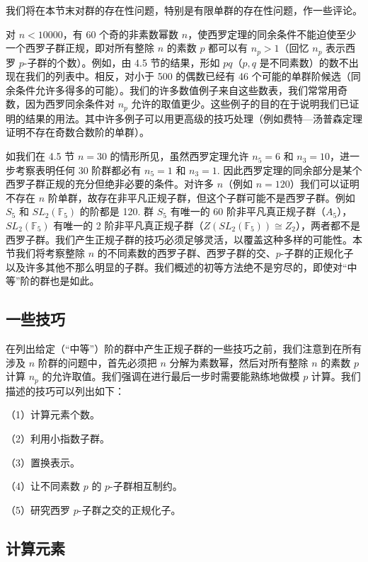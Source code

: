 我们将在本节末对群的存在性问题，特别是有限单群的存在性问题，作一些评论。

对 \(n < 10000\)，有 60 个奇的非素数幂数 \(n\)，使西罗定理的同余条件不能迫使至少一个西罗子群正规，即对所有整除 \(n\) 的素数 \(p\) 都可以有 \(n_p > 1\)（回忆 \(n_p\) 表示西罗 \(p\)-子群的个数）。例如，由 4.5 节的结果，形如 \(pq\)（\(p, q\) 是不同素数）的数不出现在我们的列表中。相反，对小于 500 的偶数已经有 46 个可能的单群阶候选（同余条件允许多得多的可能）。我们的许多数值例子来自这些数表，我们常常用奇数，因为西罗同余条件对 \(n_p\) 允许的取值更少。这些例子的目的在于说明我们已证明的结果的用法。其中许多例子可以用更高级的技巧处理（例如费特—汤普森定理证明不存在奇数合数阶的单群）。

如我们在 4.5 节 \(n = 30\) 的情形所见，虽然西罗定理允许 \(n_5 = 6\) 和 \(n_3 = 10\)，进一步考察表明任何 30 阶群都必有 \(n_5 = 1\) 和 \(n_3 = 1\). 因此西罗定理的同余部分是某个西罗子群正规的充分但绝非必要的条件。对许多 \(n\)（例如 \(n = 120\)）我们可以证明不存在 \(n\) 阶单群，故存在非平凡正规子群，但这个子群可能不是西罗子群。例如 \(S_5\) 和 \(SL_2(\mathbb{F}_5)\) 的阶都是 120. 群 \(S_5\) 有唯一的 60 阶非平凡真正规子群（\(A_5\)），\(SL_2(\mathbb{F}_5)\) 有唯一的 2 阶非平凡真正规子群（\(Z(SL_2(\mathbb{F}_5)) \cong Z_2\)），两者都不是西罗子群。我们产生正规子群的技巧必须足够灵活，以覆盖这种多样的可能性。本节我们将考察整除 \(n\) 的不同素数的西罗子群、西罗子群的交、\(p\)-子群的正规化子以及许多其他不那么明显的子群。我们概述的初等方法绝不是穷尽的，即使对“中等”阶的群也是如此。

\subsection*{一些技巧}

在列出给定（“中等”）阶的群中产生正规子群的一些技巧之前，我们注意到在所有涉及 \(n\) 阶群的问题中，首先必须把 \(n\) 分解为素数幂，然后对所有整除 \(n\) 的素数 \(p\) 计算 \(n_p\) 的允许取值。我们强调在进行最后一步时需要能熟练地做模 \(p\) 计算。我们描述的技巧可以列出如下：

（1）计算元素个数。

（2）利用小指数子群。

（3）置换表示。

（4）让不同素数 \(p\) 的 \(p\)-子群相互制约。

（5）研究西罗 \(p\)-子群之交的正规化子。

\subsection*{计算元素}

